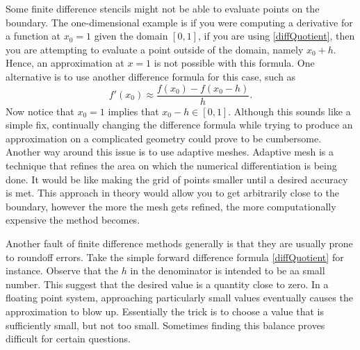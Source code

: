 \documentclass[undefended]{sfuthesis}
\begin{document}
Some finite difference stencils might not be able to evaluate points on the boundary. The one-dimensional example is if you were computing a derivative for a function at $x_0 = 1$ given the domain $[0, 1]$, if you are using \eqref{diffQuotient}, then you are attempting to evaluate a point outside of the domain, namely $x_0 + h$. Hence, an approximation at $x = 1$ is not possible with this formula. One alternative is to use another difference formula for this case, such as \[f'(x_0) \approx \frac{f(x_0) - f(x_0 - h)}{h}.\] Now notice that $x_0 = 1$ implies that $x_0 - h \in [0, 1].$ Although this sounds like a simple fix, continually changing the difference formula while trying to produce an approximation on a complicated geometry could prove to be cumbersome. Another way around this issue is to use adaptive meshes. Adaptive mesh is a technique that refines the area on which the numerical differentiation is being done. It would be like making the grid of points smaller until a desired accuracy is met. This approach in theory would allow you to get arbitrarily close to the boundary, however the more the mesh gets refined, the more computationally expensive the method becomes. 

Another fault of finite difference methods generally is that they are usually prone to roundoff errors. Take the simple forward difference formula \eqref{diffQuotient} for instance. Observe that the $h$ in the denominator is intended to be aa small number. This suggest that the desired value is a quantity close to zero. In a floating point system, approaching particularly small values eventually causes the approximation to blow up. Essentially the trick is to choose a value that is sufficiently small, but not too small. Sometimes finding this balance proves difficult for certain questions.
\end{document}
